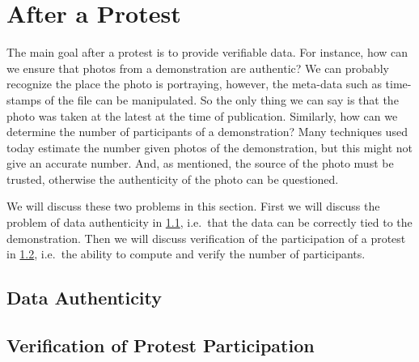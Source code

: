 \section{After a Protest}
\label{AfterProtest}

The main goal after a protest is to provide verifiable data.
For instance, how can we ensure that photos from a demonstration are authentic?
We can probably recognize the place the photo is portraying, however, the 
meta-data such as time-stamps of the file can be manipulated.
So the only thing we can say is that the photo was taken at the latest at the 
time of publication.
Similarly, how can we determine the number of participants of a demonstration?
Many techniques used today estimate the number given photos of the 
demonstration, but this might not give an accurate number.
And, as mentioned, the source of the photo must be trusted, otherwise the 
authenticity of the photo can be questioned.

We will discuss these two problems in this section.
First we will discuss the problem of data authenticity in 
\cref{DataAuthenticity}, i.e.\ that the data can be correctly tied to the 
demonstration.
Then we will discuss verification of the participation of a protest in 
\cref{ProtestVerif}, i.e.\ the ability to compute and verify the number of 
participants.

  
\subsection{Data Authenticity}
\label{DataAuthenticity}



\subsection{Verification of Protest Participation}
\label{ProtestVerif}


